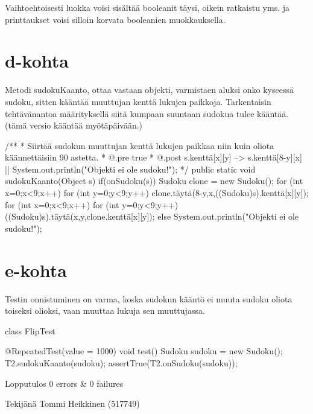 Vaihtoehtoisesti luokka voisi sisältää booleanit täysi, oikein ratkaistu yms. ja printtaukset voisi silloin
korvata booleanien muokkauksella.

\section{d-kohta}
\label{d-kohta}

Metodi sudokuKaanto, ottaa vastaan objekti, varmistaen aluksi onko kyseessä sudoku, sitten kääntää muuttujan kenttä
lukujen paikkoja. Tarkentaisin tehtävänantoa määrityksellä siitä kumpaan suuntaan sudokua tulee kääntää.
(tämä versio kääntää myötäpäivään.)
\begin{javacode}
  /**
   * Siirtää sudokun muuttujan kenttä lukujen paikkaa niin kuin
     oliota käännettäisiin 90 astetta.
   * @.pre true
   * @.post s.kenttä[x][y] --> s.kenttä[8-y][x] ||
     System.out.println("Objekti ei ole sudoku!");
   */
  public static void sudokuKaanto(Object s){
    if(onSudoku(s)) {
      Sudoku clone = new Sudoku();
      for (int x=0;x<9;x++) {
        for (int y=0;y<9;y++) {
          clone.täytä(8-y,x,((Sudoku)s).kenttä[x][y]);
        }
      }
      for (int x=0;x<9;x++) {
        for (int y=0;y<9;y++) {
          ((Sudoku)s).täytä(x,y,clone.kenttä[x][y]);
        }
      }
    }else {
      System.out.println("Objekti ei ole sudoku!");
    }
  }
\end{javacode}

\section{e-kohta}
\label{e-kohta}

Testin onnistuminen on varma, koska sudokun kääntö ei muuta sudoku oliota toiseksi olioksi, vaan muuttaa lukuja sen
muuttujassa.

\begin{javacode}
class FlipTest {

  @RepeatedTest(value = 1000)
  void test() {
    Sudoku sudoku = new Sudoku();
    T2.sudokuKaanto(sudoku);
    assertTrue(T2.onSudoku(sudoku));
  }

}
\end{javacode}
Lopputulos 0 errors & 0 failures

Tekijänä Tommi Heikkinen (517749)
